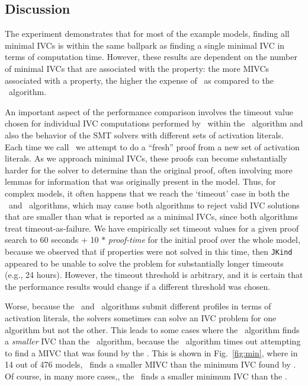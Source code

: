 \subsection {Discussion}
\label{sec:experiment-discussion}
The experiment demonstrates that for most of the example models, finding all minimal IVCs is within the same ballpark as finding a single minimal IVC in terms of computation time.  However, these results are dependent on the number of minimal IVCs that are associated with the property: the more MIVCs associated with a property, the higher the expense of \aivcalg\ as compared to the \ucbfalg\ algorithm.  

An important aspect of the performance comparison involves the timeout value chosen for individual IVC computations performed by \getivc\ within the \aivcalg\ algorithm and also the behavior of the SMT solvers with different sets of activation literals.  Each time we call \getivc\ we attempt to do a ``fresh'' proof from a new set of activation literals.  As we approach minimal IVCs, these proofs can become substantially harder for the solver to determine than the original proof, often involving more lemmas for information that was originally present in the model.  Thus, for complex models, it often happens that we reach the `timeout' case in both the \aivcalg\ and \ucbfalg\ algorithms, which may cause both algorithms to reject valid IVC solutions that are smaller than what is reported as a minimal IVCs, since both algorithms treat timeout-as-failure.  We have empirically set timeout values for a given proof search to 60 seconds + 10 $*$ {\em proof-time} for the initial proof over the whole model, because we observed that if properties were not solved in this time, then \texttt{JKind} appeared to be unable to solve the problem for substantially longer timeouts (e.g., 24 hours). However, the timeout threshold is arbitrary, and it is certain that the performance results would change if a different threshold was chosen.

Worse, because the \ucbfalg\ and \aivcalg\ algorithms submit different profiles in terms of activation literals, the solvers sometimes can solve an IVC problem for one algorithm but not the other.  This leads to some cases where the \ucbfalg\ algorithm finds a {\em smaller} IVC than the \aivcalg\ algorithm, because the \aivcalg\ algorithm times out attempting to find a MIVC that was found by the \ucbfalg.  This is shown in Fig.~\ref{fig:min}, where in 14 out of 476 models, \ucbfalg\ finds a smaller MIVC than the minimum IVC found by \aivcalg.  Of course, in many more cases,, the \aivcalg\ finds a smaller minimum IVC than the \ucbfalg.  

